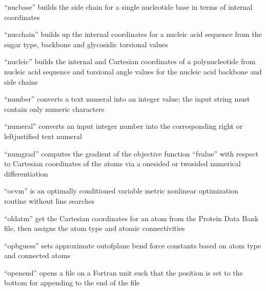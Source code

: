 \documentclass[letterpaper,11pt,english]{sphinxmanual}
\begin{document}

“nucbase” builds the side chain for a single nucleotide base
in terms of internal coordinates


“nucchain” builds up the internal coordinates for a nucleic
acid sequence from the sugar type, backbone and glycosidic
torsional values


“nucleic” builds the internal and Cartesian coordinates
of a polynucleotide from nucleic acid sequence and torsional
angle values for the nucleic acid backbone and side chains


“number” converts a text numeral into an integer value;
the input string must contain only numeric characters


“numeral” converts an input integer number into the
corresponding right\sphinxhyphen{} or left\sphinxhyphen{}justified text numeral


“numgrad” computes the gradient of the objective function
“fvalue” with respect to Cartesian coordinates of the atoms
via a one\sphinxhyphen{}sided or two\sphinxhyphen{}sided numerical differentiation


“ocvm” is an optimally conditioned variable metric nonlinear
optimization routine without line searches


“oldatm” get the Cartesian coordinates for an atom from
the Protein Data Bank file, then assigns the atom type
and atomic connectivities


“opbguess” sets approximate out\sphinxhyphen{}of\sphinxhyphen{}plane bend force constants
based on atom type and connected atoms


“openend” opens a file on a Fortran unit such that the position
is set to the bottom for appending to the end of the file

\end{document}
